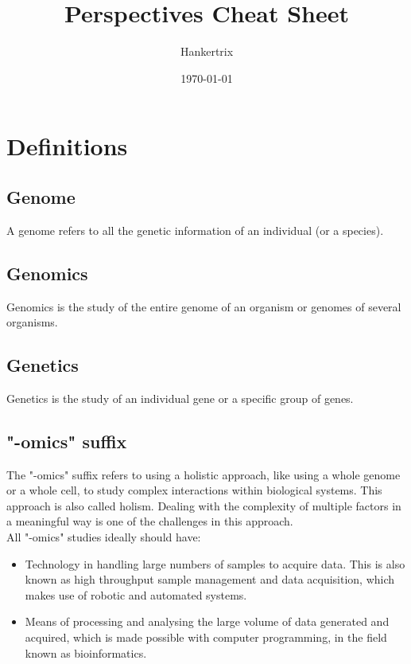 \documentclass[11pt]{article}
\author{Hankertrix}
\date{\today}
\title{Perspectives Cheat Sheet}
\begin{document}
\maketitle
\setcounter{tocdepth}{2}
\tableofcontents

\newpage

\section{Definitions}
\label{sec:orge8720e9}

\subsection{Genome}
\label{sec:org45a9363}
A genome refers to all the genetic information of an individual (or a species).

\subsection{Genomics}
\label{sec:org3c37ec0}
Genomics is the study of the entire genome of an organism or genomes of several organisms.

\subsection{Genetics}
\label{sec:org98aa80d}
Genetics is the study of an individual gene or a specific group of genes.

\subsection{"-omics" suffix}
\label{sec:orgd187e1f}
The "-omics" suffix refers to using a holistic approach, like using a whole genome or a whole cell, to study complex interactions within biological systems. This approach is also called holism. Dealing with the complexity of multiple factors in a meaningful way is one of the challenges in this approach.
\\[0pt]

All "-omics" studies ideally should have:
\begin{itemize}
\item Technology in handling large numbers of samples to acquire data. This is also known as high throughput sample management and data acquisition, which makes use of robotic and automated systems.
\item Means of processing and analysing the large volume of data generated and acquired, which is made possible with computer programming, in the field known as bioinformatics.
\end{itemize}
\end{document}
